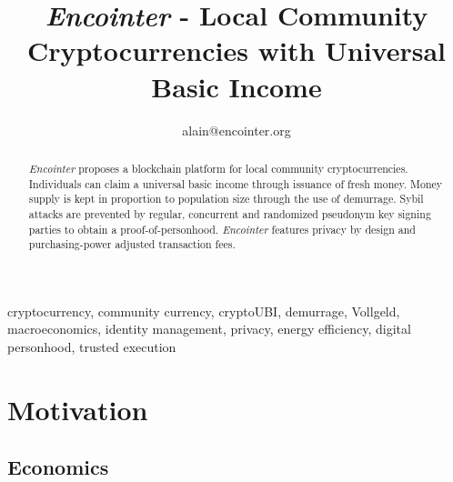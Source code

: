 \documentclass[conference]{IEEEtran}
\begin{document}
\newcommand{\encointer}{\textsl{Encointer} }



\title{\encointer - Local Community Cryptocurrencies with Universal Basic Income\\
}

\author{
alain@encointer.org}

\maketitle


\begin{abstract}
\encointer proposes a blockchain platform for local community cryptocurrencies. Individuals can claim a universal basic income through issuance of fresh money. Money supply is kept in proportion to population size through the use of demurrage. Sybil attacks are prevented by regular, concurrent and randomized pseudonym key signing parties to obtain a proof-of-personhood. \encointer features privacy by design and purchasing-power adjusted transaction fees. 
\end{abstract}

\begin{IEEEkeywords}
cryptocurrency, community currency, cryptoUBI, demurrage, Vollgeld, macroeconomics, identity management, privacy, energy efficiency, digital personhood, trusted execution
\end{IEEEkeywords}

\section{Motivation}

\subsection{Economics}
\end{document}

